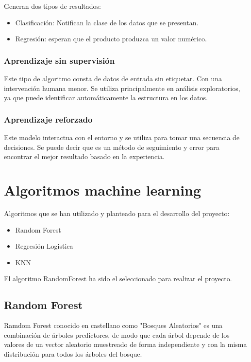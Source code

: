 Generan dos tipos de resultados:
\begin{itemize}
\item Clasificación: Notifican la clase de los datos que se presentan.
\item Regresión: esperan que el producto produzca un valor numérico.
\end{itemize}
 
\subsubsection{Aprendizaje sin supervisión}

Este tipo de algoritmo consta de datos de entrada sin etiquetar. Con una intervención humana menor. Se utiliza principalmente en análisis exploratorios, ya que puede identificar automáticamente la estructura en los datos.

\subsubsection{Aprendizaje reforzado}

Este modelo interactua con el entorno y se utiliza para tomar una secuencia de decisiones. Se puede decir que es un método de seguimiento y error para encontrar el mejor resultado basado en la experiencia.

\section{Algoritmos machine learning}

Algoritmos que se han utilizado y planteado para el desarrollo del proyecto:

\begin{itemize}
\item Random Forest
\item Regresión Logistica
\item KNN
\end{itemize}

El algoritmo RandomForest ha sido el seleccionado para realizar el proyecto.

\subsection{Random Forest}

Ramdom Forest conocido en castellano como "Bosques Aleatorios" es una combinación de árboles predictores, de modo que cada árbol depende de los valores de un vector aleatorio muestreado de forma independiente y con la misma distribución para todos los árboles del bosque.

